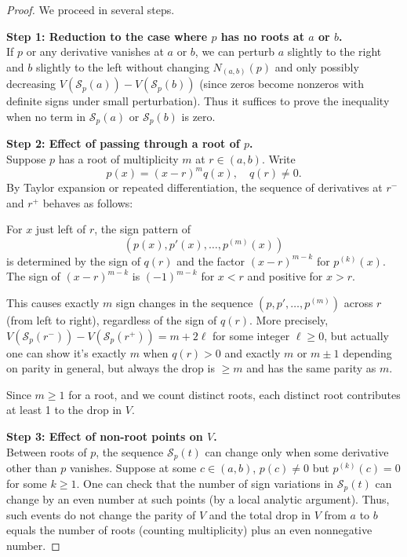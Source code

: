 \documentclass[11pt]{article}
\begin{document}
\begin{proof}
We proceed in several steps.

\noindent \textbf{Step 1: Reduction to the case where \(p\) has no roots at \(a\) or \(b\).} \\
If \(p\) or any derivative vanishes at \(a\) or \(b\), we can perturb \(a\) slightly to the right and \(b\) slightly to the left without changing \(N_{(a,b)}(p)\) and only possibly decreasing \(V(\mathcal{S}_p(a)) - V(\mathcal{S}_p(b))\) (since zeros become nonzeros with definite signs under small perturbation). Thus it suffices to prove the inequality when no term in \(\mathcal{S}_p(a)\) or \(\mathcal{S}_p(b)\) is zero.

\noindent \textbf{Step 2: Effect of passing through a root of \(p\).} \\
Suppose \(p\) has a root of multiplicity \(m\) at \(r \in (a,b)\). Write
\[
p(x) = (x-r)^m q(x), \quad q(r) \neq 0.
\]
By Taylor expansion or repeated differentiation, the sequence of derivatives at \(r^-\) and \(r^+\) behaves as follows:

For \(x\) just left of \(r\), the sign pattern of 
\[
(p(x), p'(x), \dots, p^{(m)}(x))
\]
is determined by the sign of \(q(r)\) and the factor \((x-r)^{m-k}\) for \(p^{(k)}(x)\). The sign of \((x-r)^{m-k}\) is \((-1)^{m-k}\) for \(x < r\) and positive for \(x > r\).

This causes exactly \(m\) sign changes in the sequence \((p, p', \dots, p^{(m)})\) across \(r\) (from left to right), regardless of the sign of \(q(r)\). More precisely, \(V(\mathcal{S}_p(r^-)) - V(\mathcal{S}_p(r^+)) = m + 2\ell\) for some integer \(\ell \ge 0\), but actually one can show it's exactly \(m\) when \(q(r) > 0\) and exactly \(m\) or \(m \pm 1\) depending on parity in general, but always the drop is \(\ge m\) and has the same parity as \(m\).

Since \(m \ge 1\) for a root, and we count distinct roots, each distinct root contributes at least 1 to the drop in \(V\).

\noindent \textbf{Step 3: Effect of non-root points on \(V\).} \\
Between roots of \(p\), the sequence \(\mathcal{S}_p(t)\) can change only when some derivative other than \(p\) vanishes. Suppose at some \(c \in (a,b)\), \(p(c) \neq 0\) but \(p^{(k)}(c) = 0\) for some \(k \ge 1\). One can check that the number of sign variations in \(\mathcal{S}_p(t)\) can change by an even number at such points (by a local analytic argument). Thus, such events do not change the parity of \(V\) and the total drop in \(V\) from \(a\) to \(b\) equals the number of roots (counting multiplicity) plus an even nonnegative number.


\end{proof}
\end{document}
